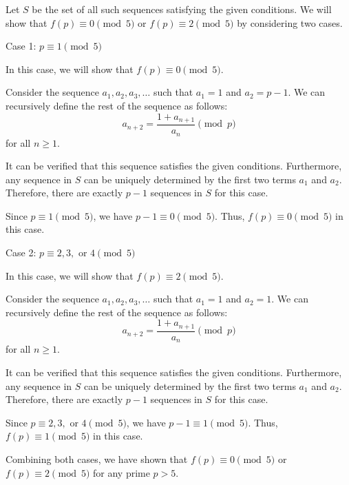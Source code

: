 Let \( S \) be the set of all such sequences satisfying the given conditions. We will show that \( f(p) \equiv 0 \pmod{5} \) or \( f(p) \equiv 2 \pmod{5} \) by considering two cases.

Case 1: \( p \equiv 1 \pmod{5} \)

In this case, we will show that \( f(p) \equiv 0 \pmod{5} \).

Consider the sequence \( a_1, a_2, a_3, \dots \) such that \( a_1 = 1 \) and \( a_2 = p-1 \). We can recursively define the rest of the sequence as follows:
\[ a_{n+2} = \frac{1 + a_{n+1}}{a_n} \pmod{p} \]
for all \( n \geq 1 \).

It can be verified that this sequence satisfies the given conditions. Furthermore, any sequence in \( S \) can be uniquely determined by the first two terms \( a_1 \) and \( a_2 \). Therefore, there are exactly \( p-1 \) sequences in \( S \) for this case.

Since \( p \equiv 1 \pmod{5} \), we have \( p-1 \equiv 0 \pmod{5} \). Thus, \( f(p) \equiv 0 \pmod{5} \) in this case.

Case 2: \( p \equiv 2, 3, \text{ or } 4 \pmod{5} \)

In this case, we will show that \( f(p) \equiv 2 \pmod{5} \).

Consider the sequence \( a_1, a_2, a_3, \dots \) such that \( a_1 = 1 \) and \( a_2 = 1 \). We can recursively define the rest of the sequence as follows:
\[ a_{n+2} = \frac{1 + a_{n+1}}{a_n} \pmod{p} \]
for all \( n \geq 1 \).

It can be verified that this sequence satisfies the given conditions. Furthermore, any sequence in \( S \) can be uniquely determined by the first two terms \( a_1 \) and \( a_2 \). Therefore, there are exactly \( p-1 \) sequences in \( S \) for this case.

Since \( p \equiv 2, 3, \text{ or } 4 \pmod{5} \), we have \( p-1 \equiv 1 \pmod{5} \). Thus, \( f(p) \equiv 1 \pmod{5} \) in this case.

Combining both cases, we have shown that \( f(p) \equiv 0 \pmod{5} \) or \( f(p) \equiv 2 \pmod{5} \) for any prime \( p > 5 \).
